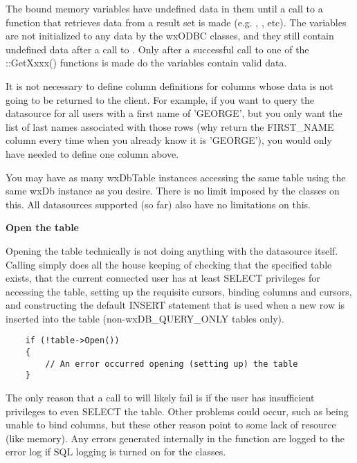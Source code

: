 The bound memory variables have undefined data in them until a call to a 
function that retrieves data from a result set is made 
(e.g. ,
, etc).  The variables are not 
initialized to any data by the wxODBC classes, and they still contain 
undefined data after a call to .  Only 
after a successful call to one of the ::GetXxxx() functions is made do the 
variables contain valid data.

It is not necessary to define column definitions for columns whose data is 
not going to be returned to the client.  For example, if you want to query 
the datasource for all users with a first name of 'GEORGE', but you only want 
the list of last names associated with those rows (why return the FIRST_NAME 
column every time when you already know it is 'GEORGE'), you would only have 
needed to define one column above.

You may have as many wxDbTable instances accessing the same table using the 
same wxDb instance as you desire.  There is no limit imposed by the classes 
on this.  All datasources supported (so far) also have no limitations on this.


{\bf Open the table}

Opening the table technically is not doing anything with the datasource 
itself.  Calling  simply does all the 
house keeping of checking that the specified table exists, that the current 
connected user has at least SELECT privileges for accessing the table, 
setting up the requisite cursors,  binding columns and cursors, and 
constructing the default INSERT statement that is used when a new row is 
inserted into the table (non-wxDB_QUERY_ONLY tables only).

\begin{verbatim}
    if (!table->Open())
    {
        // An error occurred opening (setting up) the table
    }
\end{verbatim}

The only reason that a call to  will likely fail is if the 
user has insufficient privileges to even SELECT the table.  Other problems 
could occur, such as being unable to bind columns, but these other reason 
point to some lack of resource (like memory).  Any errors generated 
internally in the  function are logged to the error log 
if SQL logging is turned on for the classes.


